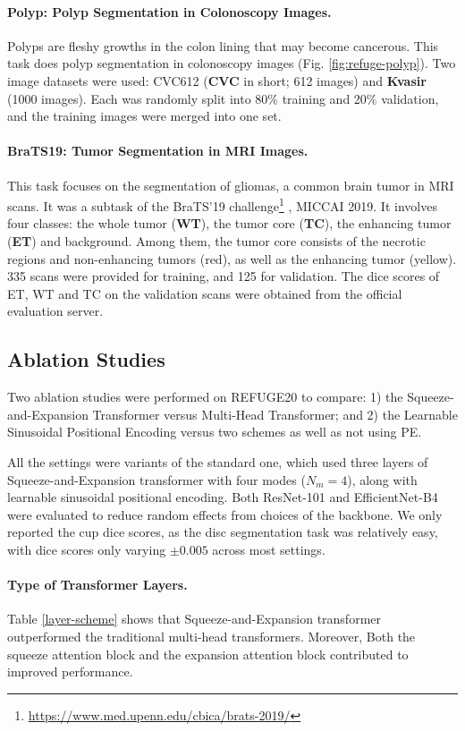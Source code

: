 \documentclass{article}
\begin{document}
\paragraph{Polyp: Polyp Segmentation in Colonoscopy Images.}
Polyps are fleshy growths in the colon lining that may become cancerous. This task does polyp segmentation in colonoscopy images (Fig. \ref{fig:refuge-polyp}). Two image datasets \cite{pranet} were used: CVC612 (\textbf{CVC} in short; 612 images) and \textbf{Kvasir} (1000 images). Each was randomly split into 80\% training and 20\% validation, and the training images were merged into one set.

\paragraph{BraTS19: Tumor Segmentation in MRI Images.}
This task focuses on the segmentation of gliomas, a common brain tumor in MRI scans. It was a subtask of the BraTS'19 challenge\footnote{\url{https://www.med.upenn.edu/cbica/brats-2019/}}  \cite{brats-tmi,brats-sci-data}, MICCAI 2019. It involves four classes: the whole tumor (\textbf{WT}), the tumor core (\textbf{TC}), the enhancing tumor (\textbf{ET}) and background. Among them, the tumor core consists of the necrotic regions and non-enhancing tumors (red), as well as the enhancing tumor (yellow). 335 scans were provided for training, and 125 for validation. The dice scores of ET, WT and TC on the validation scans were obtained from the official evaluation server.

\subsection{Ablation Studies}
Two ablation studies were performed on REFUGE20 to compare: 1) the Squeeze-and-Expansion Transformer versus Multi-Head Transformer; and 2) the Learnable Sinusoidal Positional Encoding versus two schemes as well as not using PE.

All the settings were variants of the standard one, which used three layers of Squeeze-and-Expansion transformer with four modes ($N_m=4$), along with learnable sinusoidal positional encoding. Both ResNet-101 and EfficientNet-B4 were evaluated to reduce random effects from choices of the backbone. We only reported the cup dice scores, as the disc segmentation task was relatively easy, with dice scores only varying $\pm 0.005$ across most settings. 

\paragraph{Type of Transformer Layers.}
Table \ref{layer-scheme} shows that Squeeze-and-Expansion transformer outperformed the traditional multi-head transformers. Moreover, Both the squeeze attention block and the expansion attention block contributed to improved performance.
\end{document}
